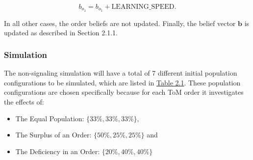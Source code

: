 \[
    b_{o_1} = b_{o_1} + \text{{LEARNING\_SPEED}}.
\]

In all other cases, the order beliefs are not updated. Finally, the belief vector $\mathbf{b}$ is updated as described in Section 2.1.1.

\subsubsection{Simulation}

The non-signaling simulation will have a total of 7 different initial population configurations to be simulated, which are listed in \hyperref[tab:reg-population-table]{Table 2.1}. These population configurations are chosen specifically because for each ToM order it investigates the effects of:
\begin{itemize}
    \item The Equal Population: $\{33\%,33\%,33\%\}$,
    \item The Surplus of an Order: $\{50\%,25\%,25\%\}$ and 
    \item The Deficiency in an Order: $\{20\%,40\%,40\%\}$
\end{itemize}

